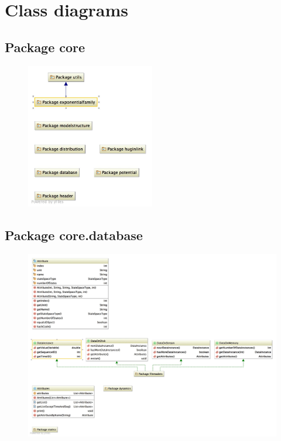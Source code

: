 \newpage
\section{Class diagrams}
\label{classDiagrams}

\subsection{Package core}
\begin{figure}[H]
  \centering
    \includegraphics[width=0.5\textwidth]{ClassDiagrams/core.jpg}
\end{figure}

\subsection{Package core.database}
\begin{figure}[H]
  \centering
    \includegraphics[width=\textwidth]{ClassDiagrams/core_database.jpg}
\end{figure}

